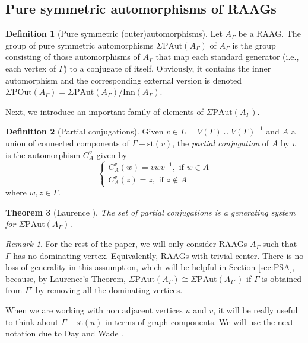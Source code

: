 \documentclass[a4paper]{amsart}
\newcommand{\G}{\Gamma}
\newcommand{\A}{{A_\Gamma}}
\newcommand{\PAut}{\Sigma\mathrm{PAut}}
\newcommand{\POut}{\Sigma\mathrm{POut}}
\newcommand{\st}{\mathrm{st}}
\newcommand{\Inn}{\mathrm{Inn}}
\newtheorem{teo}{Theorem}[section]
\theoremstyle{definition}
\newtheorem{defi}[teo]{Definition}
\theoremstyle{remark}
\newtheorem*{nota}{Remark}
\begin{document}
\subsection{Pure symmetric automorphisms of RAAGs} 



\begin{defi}[Pure symmetric (outer)automorphisms] Let $A_\Gamma$ be a RAAG. The group of pure symmetric automorphisms $\PAut(A_\G)$ of $A_\G$ is the group consisting of those automorphisms of $A_\G$ that map each standard generator  (i.e., each vertex of $\G$) to a conjugate of itself. Obviously, it contains the inner automorphism and the corresponding external version is denoted $\POut(A_\G)=\PAut(A_\G)/\Inn(A_\G).$
\end{defi}

Next, we introduce an important family of elements of $\PAut(A_\G)$.



\begin{defi}[Partial conjugations]
Given $v \in L= V(\G)\cup V(\G)^{-1}$ and $A$ a union of connected components of $\Gamma-\st(v)$, the {\sl partial conjugation} of $A$ by $v$ is the automorphism $C_{A}^v$  given by
$$
\left\{\begin{array}{l}
C_{A}^v(w)=vwv^{-1}, \text{ if } w \in A \\
C_{A}^v(z)=z, \text{ if } z \notin A
\end{array}\right.
$$   
where $w,z\in\G$.
\end{defi}



\begin{teo}[Laurence \cite{Lau}] The set of partial conjugations is a generating system for $\PAut(A_\G)$.   \label{teo:partialGen}
\end{teo}

\begin{nota}
    For the rest of the paper, we will only consider RAAGs $\A$ such that $\G$ has no dominating vertex. Equivalently, RAAGs with trivial center. There is no loss of generality in this assumption, which will be helpful in Section \ref{sec:PSA}, because, by Laurence's Theorem,  $\PAut(\A)\cong\PAut(A_{\G'})$ if $\G$ is obtained from $\G'$ by removing all the dominating vertices. \label{note:centre}
\end{nota}

When we are working with  non adjacent vertices $u$ and $v$, it will be really useful to think about $\G-\st(u)$ in terms of graph components. We will use the next notation due to Day and Wade \cite{DayWade}. 
\end{document}
